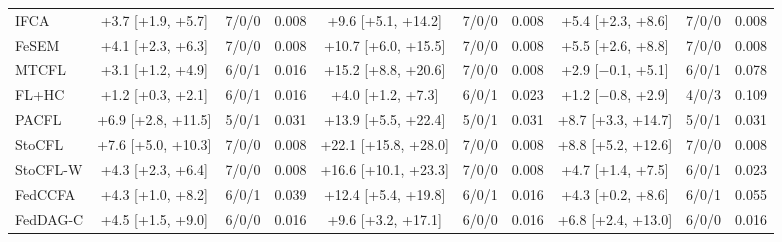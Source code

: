 {{\begin{tabular}{l c c c c c c c c c}
IFCA & +3.7 [+1.9, +5.7] & 7/0/0 & 0.008 & +9.6 [+5.1, +14.2] & 7/0/0 & 0.008 & +5.4 [+2.3, +8.6] & 7/0/0 & 0.008 \\
FeSEM & +4.1 [+2.3, +6.3] & 7/0/0 & 0.008 & +10.7 [+6.0, +15.5] & 7/0/0 & 0.008 & +5.5 [+2.6, +8.8] & 7/0/0 & 0.008 \\
MTCFL & +3.1 [+1.2, +4.9] & 6/0/1 & 0.016 & +15.2 [+8.8, +20.6] & 7/0/0 & 0.008 & +2.9 [$-$0.1, +5.1] & 6/0/1 & 0.078 \\
FL+HC & +1.2 [+0.3, +2.1] & 6/0/1 & 0.016 & +4.0 [+1.2, +7.3] & 6/0/1 & 0.023 & +1.2 [$-$0.8, +2.9] & 4/0/3 & 0.109 \\
PACFL & +6.9 [+2.8, +11.5] & 5/0/1 & 0.031 & +13.9 [+5.5, +22.4] & 5/0/1 & 0.031 & +8.7 [+3.3, +14.7] & 5/0/1 & 0.031 \\
StoCFL & +7.6 [+5.0, +10.3] & 7/0/0 & 0.008 & +22.1 [+15.8, +28.0] & 7/0/0 & 0.008 & +8.8 [+5.2, +12.6] & 7/0/0 & 0.008 \\
StoCFL-W & +4.3 [+2.3, +6.4] & 7/0/0 & 0.008 & +16.6 [+10.1, +23.3] & 7/0/0 & 0.008 & +4.7 [+1.4, +7.5] & 6/0/1 & 0.023 \\
FedCCFA & +4.3 [+1.0, +8.2] & 6/0/1 & 0.039 & +12.4 [+5.4, +19.8] & 6/0/1 & 0.016 & +4.3 [+0.2, +8.6] & 6/0/1 & 0.055 \\
FedDAG-C & +4.5 [+1.5, +9.0] & 6/0/0 & 0.016 & +9.6 [+3.2, +17.1] & 6/0/0 & 0.016 & +6.8 [+2.4, +13.0] & 6/0/0 & 0.016 \\
\bottomrule
\end{tabular}}
}
